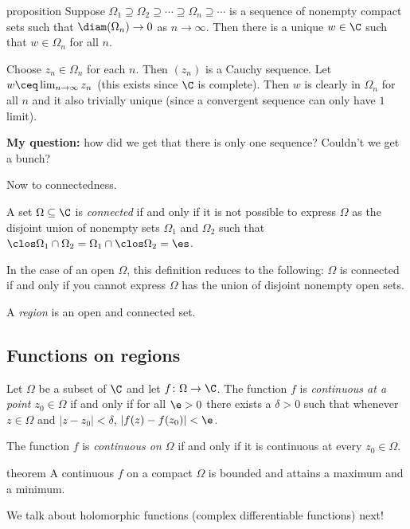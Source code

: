 \documentclass[class=article, crop=false]{standalone}
\begin{document}
\begin{result}{proposition}
  Suppose $\Omega_1 \supseteq \Omega_2 \supseteq \cdots \supseteq \Omega_n \supseteq \cdots$ is a sequence of nonempty compact sets such that $\diam(\Omega_n) \to 0$ as $n \to \infty$. Then there is a unique $w \in \C$ such that $w \in \Omega_n$ for all $n$.
\end{result}
\begin{pf}
  Choose $z_n \in \Omega_n$ for each $n$. Then $(z_n)$ is a Cauchy sequence.
  Let $w \ceq \lim_{n \to \infty} z_n$ (this exists since $\C$ is complete).
  Then $w$ is clearly in $\Omega_n$ for all $n$ and it also trivially unique
  (since a convergent sequence can only have $1$ limit).

  \textbf{My question:} how did we get that there is only one sequence? Couldn't we get a bunch?
\end{pf}

Now to connectedness.
\begin{defn}
  A set $\Omega \subseteq \C$ is \emph{connected} if and only if it is not possible to express $\Omega$ as the disjoint union of nonempty sets $\Omega_1$ and $\Omega_2$ such that $\clos \Omega_1\cap \Omega_2 = \Omega_1 \cap\clos \Omega_2 = \es$.
\end{defn}
\begin{rem}
  In the case of an open $\Omega$, this definition reduces to the following: $\Omega$ is connected if and only if you cannot express $\Omega$ has the union of disjoint nonempty open sets.
\end{rem}

\begin{defn}
  A \emph{region} is an open and connected set.
\end{defn}

\subsection*{Functions on regions}

\begin{defn}
  Let $\Omega$ be a subset of $\C$ and let $f\colon \Omega \to \C$. The function $f$ is \emph{continuous at a point $z_0 \in\Omega$} if and only if for all $\e>0$ there exists a $\delta > 0$ such that whenever $z \in \Omega$ and $|z-z_0| < \delta$, $|f(z)-f(z_0)| < \e$.

  The function $f$ is \emph{continuous on $\Omega$} if and only if it is continuous at every $z_0 \in \Omega$.
\end{defn}

\begin{result}{theorem}
  A continuous $f$ on a compact $\Omega$ is bounded and attains a maximum and a minimum.
\end{result}

We talk about holomorphic functions (complex differentiable functions) next!
\end{document}
